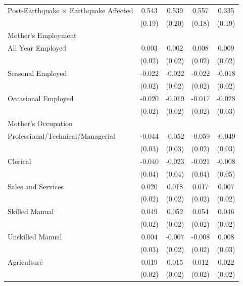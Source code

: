 \begin{longtable}{l*{4}{c}}
Post-Earthquake × Earthquake Affected & 0.543\sym{***} & 0.539\sym{***} & 0.557\sym{***} & 0.335\sym{*} \\
                    & (0.19) & (0.20) & (0.18) & (0.19) \\
\multicolumn{5}{l}{Mother's Employment} \\
\hspace{1em}All Year Employed & 0.003 & 0.002 & 0.008 & 0.009 \\
                    & (0.02) & (0.02) & (0.02) & (0.02) \\
\hspace{1em}Seasonal Employed & -0.022 & -0.022 & -0.022 & -0.018 \\
                    & (0.02) & (0.02) & (0.02) & (0.02) \\
\hspace{1em}Occasional Employed & -0.020 & -0.019 & -0.017 & -0.028 \\
                    & (0.02) & (0.02) & (0.02) & (0.03) \\
\multicolumn{5}{l}{Mother's Occupation} \\
\hspace{1em}Professional/Technical/Managerial & -0.044 & -0.052\sym{**} & -0.059\sym{**} & -0.049\sym{*} \\
                    & (0.03) & (0.03) & (0.02) & (0.03) \\
\hspace{1em}Clerical & -0.040 & -0.023 & -0.021 & -0.008 \\
                    & (0.04) & (0.04) & (0.04) & (0.05) \\
\hspace{1em}Sales and Services & 0.020 & 0.018 & 0.017 & 0.007 \\
                    & (0.02) & (0.02) & (0.02) & (0.02) \\
\hspace{1em}Skilled Manual & 0.049\sym{***} & 0.052\sym{***} & 0.054\sym{***} & 0.046\sym{**} \\
                    & (0.02) & (0.02) & (0.02) & (0.02) \\
\hspace{1em}Unskilled Manual & 0.004 & -0.007 & -0.008 & 0.008 \\
                    & (0.03) & (0.02) & (0.02) & (0.03) \\
\hspace{1em}Agriculture & 0.019 & 0.015 & 0.012 & 0.022 \\
                    & (0.02) & (0.02) & (0.02) & (0.02) \\

\end{longtable}
